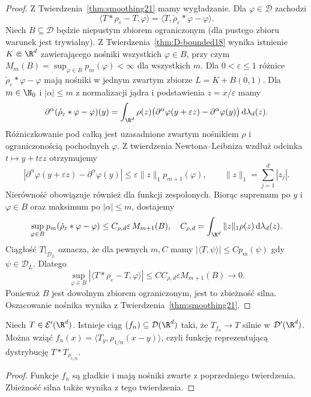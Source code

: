 \begin{proof}
Z Twierdzenia~\ref{thm:smoothing21} mamy wygładzanie.
Dla $\varphi\in\mathcal D$ zachodzi
\[
 \langle T*\rho_\varepsilon-T,\varphi\rangle
 =\langle T,\check\rho_\varepsilon*\varphi-\varphi\rangle.
\]
Niech $B\subseteq\mathcal D$ będzie niepustym zbiorem
ograniczonym (dla pustego zbioru warunek jest trywialny).
Z Twierdzenia~\ref{thm:D-bounded18}
wynika istnienie $K\Subset\R^d$ zawierającego nośniki
wszystkich $\varphi\in B$, przy czym
$M_m(B)=\sup_{\varphi\in B}p_m(\varphi)<\infty$
dla wszystkich $m$. Dla $0<\varepsilon\le1$
różnice $\check\rho_\varepsilon*\varphi-\varphi$
mają nośniki w jednym zwartym zbiorze
$L=K+\overline{B(0,1)}$. Dla $m\in\N_0$ i $|\alpha|\le m$ z normalizacji jądra
i podstawienia $z=x/\varepsilon$ mamy
\[
\begin{aligned}
 \partial^\alpha(\check\rho_\varepsilon*\varphi-\varphi)(y)
 =\int_{\R^d}\rho(z)
 \bigl(\partial^\alpha\varphi(y+\varepsilon z)
 -\partial^\alpha\varphi(y)\bigr)\,\mathrm d\lambda_d(z).
\end{aligned}
\]
Różniczkowanie pod całką jest uzasadnione zwartym
nośnikiem $\rho$ i ograniczonością pochodnych $\varphi$.
Z twierdzenia Newtona--Leibniza wzdłuż odcinka
$t\mapsto y+t\varepsilon z$ otrzymujemy
\[
 |\partial^\alpha\varphi(y+\varepsilon z)
 -\partial^\alpha\varphi(y)|
 \le\varepsilon\|z\|_1 p_{m+1}(\varphi),
 \qquad \|z\|_1=\sum_{j=1}^d|z_j|.
\]
Nierówność obowiązuje również dla funkcji zespolonych.
Biorąc supremum po $y$ i $\varphi\in B$ oraz maksimum
po $|\alpha|\le m$, dostajemy
\[
 \sup_{\varphi\in B}p_m(\check\rho_\varepsilon*\varphi
 -\varphi)
 \le C_{\rho,d}\varepsilon\,M_{m+1}(B),
 \quad
 C_{\rho,d}=\int_{\R^d}\|z\|_1\rho(z)\,\mathrm d\lambda_d(z).
\]
Ciągłość $T|_{\mathcal D_L}$ oznacza, że dla pewnych
$m,C$ mamy $|\langle T,\psi\rangle|\le Cp_m(\psi)$
gdy $\psi\in\mathcal D_L$. Dlatego
\[
 \sup_{\varphi\in B}|\langle T*\rho_\varepsilon-T,
 \varphi\rangle|
 \le CC_{\rho,d}\varepsilon M_{m+1}(B)\longrightarrow0.
\]
Ponieważ $B$ jest dowolnym zbiorem ograniczonym,
jest to zbieżność silna. Oszacowanie nośnika wynika
z Twierdzenia~\ref{thm:smoothing21}.
\end{proof}

\begin{wniosek}
\label{cor:dense-test-compact21}
Niech $T\in\mathcal E'(\R^d)$. Istnieje ciąg
$(f_n)\subseteq\mathcal D(\R^d)$ taki, że
$T_{f_n}\to T$ silnie w $\mathcal D'(\R^d)$.
Można wziąć $f_n(x)=\langle T_y,\rho_{1/n}(x-y)\rangle$,
czyli funkcję reprezentującą dystrybucję $T*T_{\rho_{1/n}}$.
\end{wniosek}
\begin{proof}
Funkcje $f_n$ są gładkie i mają nośniki zwarte
z poprzedniego twierdzenia. Zbieżność silna także
wynika z tego twierdzenia.
\end{proof}

